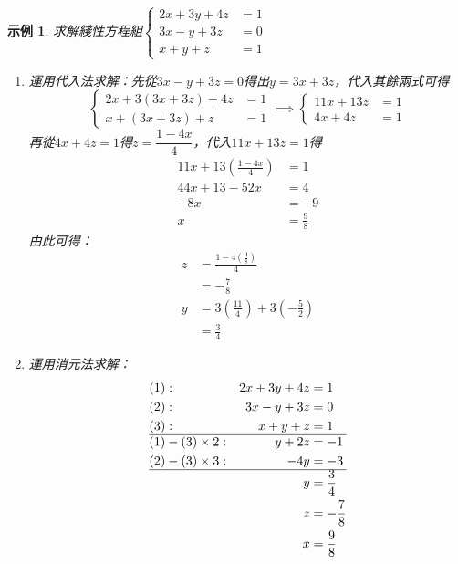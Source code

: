 \documentclass[12pt]{article}
\newtheorem*{example}{示例}
\begin{document}
    \begin{example}
        求解綫性方程組$\begin{cases}
            2x+3y+4z&=1\\
            3x-y+3z&=0\\
            x+y+z&=1
        \end{cases}$\begin{enumerate}
            \item 運用代入法求解：先從$3x-y+3z=0$得出$y=3x+3z$，代入其餘兩式可得$$\begin{cases}
                2x+3(3x+3z)+4z&=1\\
                x+(3x+3z)+z&=1
            \end{cases}\implies\begin{cases}
                11x+13z&=1\\
                4x+4z&=1
            \end{cases}$$
            再從$4x+4z=1$得$z=\dfrac{1-4x}{4}$，代入$11x+13z=1$得\begin{align*}
                11x+13(\frac{1-4x}{4})&=1\\
                44x+13-52x&=4\\
                -8x&=-9\\
                x&=\frac{9}{8}
            \end{align*}
            由此可得：\begin{align*}
                z&=\frac{1-4(\frac{9}{8})}{4}\\ &=-\frac{7}{8}\\
                y&=3(\frac{11}{4})+3(-\frac{5}{2})\\ &=\frac{3}{4}
            \end{align*}
            \item 運用消元法求解：\begin{align*}
                &(1):&2x+3y+4z&=1\\
                &(2):&3x-y+3z&=0\\
                &(3):&x+y+z&=1\\
                \hline
                &(1)-(3)\times 2:&y+2z&=-1\\
                &(2)-(3)\times 3:&-4y&=-3\\
                \hline
                &&y&=\frac{3}{4}\\
                &&z&=-\frac{7}{8}\\
                &&x&=\frac{9}{8}
            \end{align*}
        \end{enumerate}
    \end{example}
\end{document}
